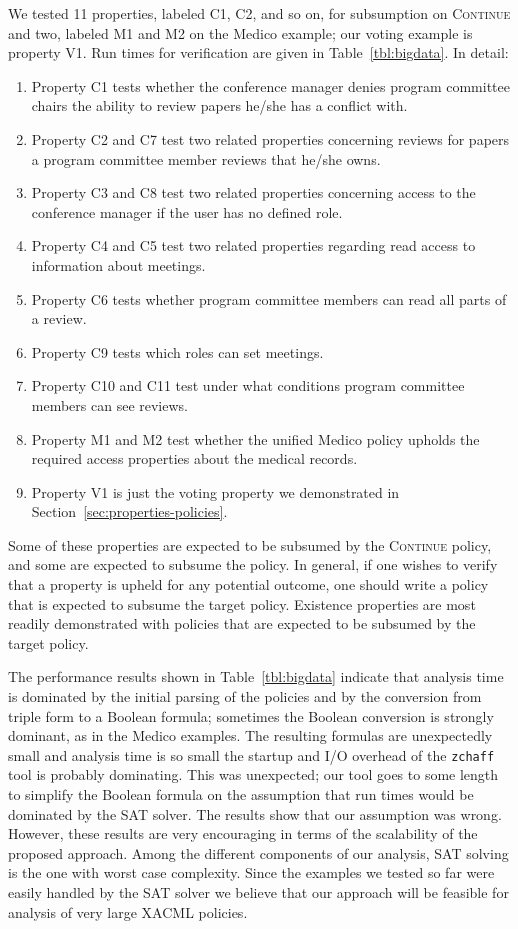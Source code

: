 We tested 11 properties, labeled C1, C2, and so on, for subsumption
on \textsc{Continue} and two, labeled M1 and M2 on the Medico
example; our voting example is property V1.  Run times for
verification are given in Table~\ref{tbl:bigdata}.  In detail:
\begin{enumerate}
\item Property C1 tests whether the conference manager denies program
  committee chairs the ability to review papers he/she has a conflict
  with.
\item Property C2 and C7 test two related properties concerning
  reviews for papers a program committee member reviews that he/she
  owns.
\item Property C3 and C8 test two related properties concerning access
  to the conference manager if the user has no defined role.
\item Property C4 and C5 test two related properties regarding read
  access to information about meetings.
\item Property C6 tests whether program committee members can read
  all parts of a review.
\item Property C9 tests which roles can set meetings.
\item Property C10 and C11 test under what conditions program
  committee members can see reviews.
\item Property M1 and M2 test whether the unified Medico policy
  upholds the required access properties about the medical records.
\item Property V1 is just the voting property we demonstrated in
  Section~\ref{sec:properties-policies}.
\end{enumerate}
Some of these properties are expected to be subsumed by the
\textsc{Continue} policy, and some are expected to subsume the policy.
In general, if one wishes to verify that a property is upheld for any
potential outcome, one should write a policy that is expected to
subsume the target policy.  Existence properties are most readily
demonstrated with policies that are expected to be subsumed by the
target policy.

The performance results shown in Table~\ref{tbl:bigdata} indicate that
analysis time is dominated by the initial parsing of the
policies and by the conversion from triple form to a Boolean formula;
sometimes the Boolean conversion is strongly dominant, as in the
Medico examples.  The resulting formulas are unexpectedly small and
analysis time is so small the startup and I/O overhead of the
\texttt{zchaff} tool is probably dominating.  This was unexpected; our
tool goes to some length to simplify the Boolean formula on the
assumption that run times would be dominated by the SAT solver. 
The results show that our assumption was wrong.
However, these results are very encouraging in terms of the scalability
of the proposed approach. Among the different components of our
analysis, SAT solving is the one with worst case complexity.
Since the examples we tested so far were easily handled by the SAT solver
we believe that our approach will be feasible for analysis of very
large XACML policies.

